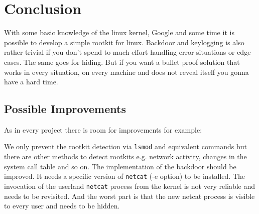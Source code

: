 \documentclass[12pt]{article}
\newcommand{\shellcmdinline}[1]{\texttt{\footnotesize #1}}
\begin{document}
\section{Conclusion}

With some basic knowledge of the linux kernel, Google and some time it is possible to develop a simple rootkit for linux. Backdoor and keylogging is also rather trivial if you don't spend to much effort handling error situations or edge cases. The same goes for hiding. But if you want a bullet proof solution that works in every situation, on every machine and does not reveal itself you gonna have a hard time. 

\label{sec:conc}
\subsection{Possible Improvements}
As in every project there is room for improvements for example:

We only prevent the rootkit detection via \shellcmdinline{lsmod} and equivalent commands but there are other methods to detect rootkits e.g. network activity, changes in the system call table and so on. The implementation of the backdoor should be improved. It needs a specific version of \shellcmdinline{netcat} (-e option) to be installed. The invocation of the userland \shellcmdinline{netcat} process from the kernel is not very reliable and needs to be revisited. And the worst part is that the new netcat process is visible to every user and needs to be hidden.  
\end{document}
